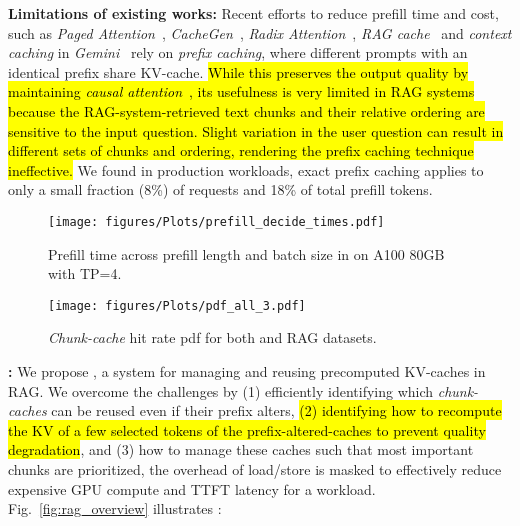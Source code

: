 \textbf{Limitations of existing works:}
Recent efforts to reduce prefill time and cost, such as \textit{Paged Attention}~\cite{kwon2023efficient}, \textit{CacheGen}~\cite{liu2023cachegen}, \textit{Radix Attention}~\cite{zheng2023efficiently}, \textit{RAG cache}~\cite{jin2024ragcache}
and \textit{context caching} in \textit{Gemini}~\cite{reid2024gemini} rely on \textit{prefix caching}, 
where different prompts with an identical prefix share KV-cache.
\hl{While this preserves the output quality by maintaining \textit{causal attention}~\cite{vaswani2017attention}, its usefulness is very limited in RAG systems because the RAG-system-retrieved text chunks and their relative ordering are sensitive to 
the input question. Slight variation in the user question can result in different sets of chunks and ordering, rendering the prefix caching technique ineffective. }
We found in production workloads, exact prefix caching applies to only a small fraction (8\%) of requests and 18\% of total prefill tokens. 



\begin{figure}[t]
    \centering
    \begin{minipage}{0.5\linewidth}
        \centering
        \texttt{[image: figures/Plots/prefill\_decide\_times.pdf]}
        \caption{Prefill time across prefill length and batch size in \vllm on A100 80GB with TP=4.}
        \label{fig:prefill_times_into}
    \end{minipage}
    \hspace{0.5em}
    \begin{minipage}{0.4\linewidth}
        \centering
        \texttt{[image: figures/Plots/pdf\_all\_3.pdf]}
        \caption{\textit{Chunk-cache} hit rate pdf for both \X and RAG datasets.}
        \label{fig:lmsys_pd}
    \end{minipage}
\end{figure}

\textbf{\sys:}
We propose \sys, a system
for managing and reusing precomputed KV-caches in RAG. 
We overcome the challenges by (1) efficiently identifying which \textit{chunk-caches} can be reused even if their prefix alters, \hl{(2) identifying how to recompute the KV of a few selected tokens of the prefix-altered-caches to prevent quality degradation}, and (3) how to manage these caches such that most important chunks are prioritized, the overhead of load/store is masked to effectively reduce expensive GPU compute and TTFT latency for a workload. 
Fig.~\ref{fig:rag_overview} illustrates 
\sys:


